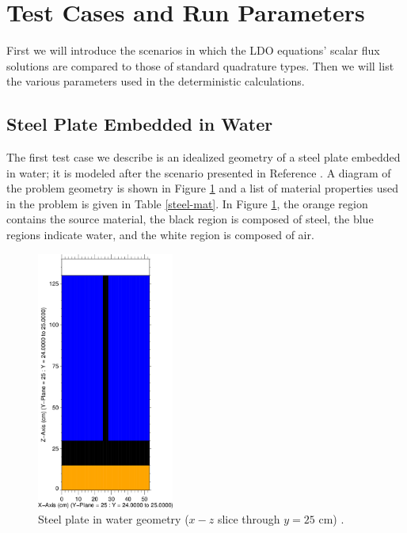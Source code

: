 \documentclass{article} %
\begin{document}
\section{Test Cases and Run Parameters}

First we will introduce the scenarios in which the LDO equations' scalar flux
solutions are compared to those of standard quadrature types. Then we will list
the various parameters used in the deterministic calculations.

\subsection{Steel Plate Embedded in Water}

The first test case we describe is an idealized geometry of a steel plate 
embedded in water; it is modeled after the scenario presented in Reference 
\cite{wilsonslaybaugh}. 
A diagram of the problem geometry is shown in Figure \ref{steelxz} and a list
of material properties used in the problem is given in Table \ref{steel-mat}.
In Figure \ref{steelxz}, the orange region contains the source material, the 
black region is composed of steel, the blue regions indicate water, and the 
white region is composed of air.

\begin{figure}[!htb]
\centering
\includegraphics[width=0.4\textwidth]{img/steel-xz.png}
\caption{Steel plate in water geometry ($x-z$ slice through $y = 25$ cm) 
         \cite{wilsonslaybaugh}.}
\label{steelxz}
\end{figure}
\end{document}
